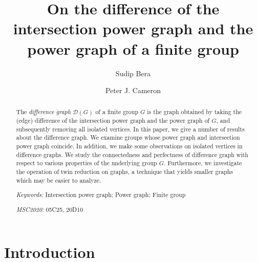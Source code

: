 \documentclass[12pt]{amsart}
\title{}
\theoremstyle{plain}
\theoremstyle{remark}
\theoremstyle{definition}
\begin{document}
\title [Difference of intersection power graph and power graph]{On the difference of the intersection power graph and the power graph of a finite group}
\author[Sudip Bera]{Sudip Bera}
\author[Peter J. Cameron]{Peter J. Cameron}
\address[Sudip Bera]{Faculty of Mathematics, Dhirubhai Ambani University, Gandhinagar, India}
\address[Peter J. Cameron]{School of Mathematics and Statistics, University of St. Andrews, UK}

		
		\begin{abstract}
The \emph{difference graph} $\mathcal{D}(G)$ of a finite group $G$ is the graph obtained by taking the (edge)
difference of the intersection power graph and the power graph of $G$, and subsequently removing all isolated vertices. In this paper, we give a number of results about the difference graph. 
We examine groups whose power graph and intersection power graph coincide. 
In addition, we make some observations on isolated vertices in difference graphs. 
We study the connectedness and perfectness of difference graph 
with respect to various properties of the underlying group $G$. 
Furthermore, we investigate the operation of twin reduction on graphs, 
a technique that yields smaller graphs which may be easier to analyze.

\medskip
		
\textit{Keywords:}		%
Intersection power graph; Power graph; Finite group
			
			\medskip  
			
\textit{MSC2020:} 05C25, 20D10 
			
\end{abstract}

\maketitle	
	
    
\section{Introduction}
\label{sec:introduction}
\end{document}
